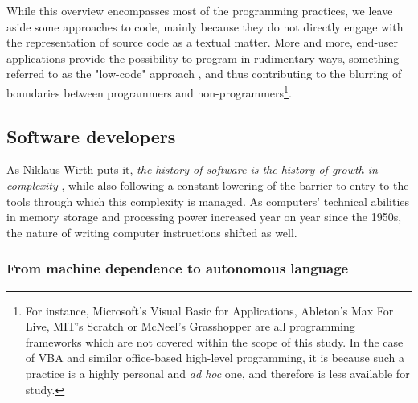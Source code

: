 While this overview encompasses most of the programming practices, we leave aside some approaches to code, mainly because they do not directly engage with the representation of source code as a textual matter. More and more, end-user applications provide the possibility to program in rudimentary ways, something referred to as the "low-code" approach \citep{team_lowcode_2021}, and thus contributing to the blurring of boundaries between programmers and non-programmers\footnote{For instance, Microsoft's Visual Basic for Applications, Ableton's Max For Live, MIT's Scratch or McNeel's Grasshopper are all programming frameworks which are not covered within the scope of this study. In the case of VBA and similar office-based high-level programming, it is because such a practice is a highly personal and \emph{ad hoc} one, and therefore is less available for study.}.

\subsection{Software developers}
\label{subsec:software-developers}

As Niklaus Wirth puts it, \emph{the history of software is the history of growth in complexity} \citep{wirth_brief_2008}, while also following a constant lowering of the barrier to entry to the tools through which this complexity is managed. As computers' technical abilities in memory storage and processing power increased year on year since the 1950s, the nature of writing computer instructions shifted as well.

\subsubsection{From machine dependence to autonomous language}
\label{subsubsec:from-machine-to-language}

